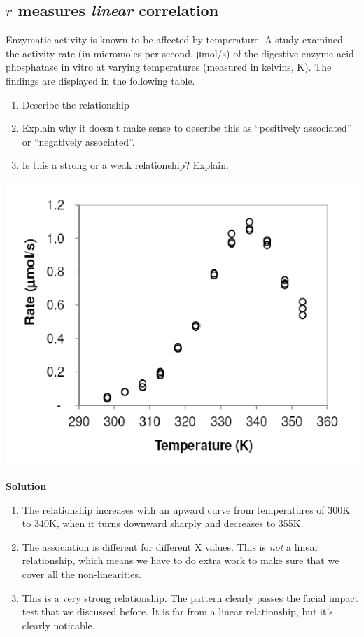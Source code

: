 \documentclass[
  letterpaper,
  DIV=11,
  numbers=noendperiod,
  oneside]{scrreprt}
\providecommand{\tightlist}{%
  \setlength{\itemsep}{0pt}\setlength{\parskip}{0pt}}\usepackage{longtable,booktabs,array}
\begin{document}
\hypertarget{r-measures-linear-correlation}{%
\subsection{\texorpdfstring{\(r\) measures \emph{linear}
correlation}{r measures linear correlation}}\label{r-measures-linear-correlation}}

Enzymatic activity is known to be affected by temperature. A study
examined the activity rate (in micromoles per second, μmol/s) of the
digestive enzyme acid phosphatase in vitro at varying temperatures
(measured in kelvins, K). The findings are displayed in the following
table.

\begin{enumerate}
\def\labelenumi{\alph{enumi}.}
\tightlist
\item
  Describe the relationship
\item
  Explain why it doesn't make sense to describe this as ``positively
  associated'' or ``negatively associated''.
\item
  Is this a strong or a weak relationship? Explain.
\end{enumerate}

\includegraphics{figs/non-linear.png}

\textbf{Solution}

\begin{enumerate}
\def\labelenumi{\alph{enumi}.}
\tightlist
\item
  The relationship increases with an upward curve from temperatures of
  300K to 340K, when it turns downward sharply and decreases to 355K.
\item
  The association is different for different X values. This is
  \emph{not} a linear relationship, which means we have to do extra work
  to make sure that we cover all the non-linearities.
\item
  This is a very strong relationship. The pattern clearly passes the
  facial impact test that we discussed before. It is far from a linear
  relationship, but it's clearly noticable.
\end{enumerate}
\end{document}
